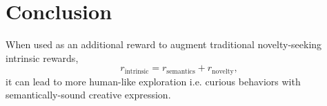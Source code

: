\chapter{Conclusion}
\label{sec:conclusion}

When used as an additional reward to augment traditional novelty-seeking intrinsic rewards, 
\begin{equation}
    \label{eq:intrinsic-reward}
    r_{\text{intrinsic}} = r_{\text{semantics}} + r_{\text{novelty}},
\end{equation}
it can lead to more human-like exploration i.e. curious behaviors with semantically-sound creative expression.

